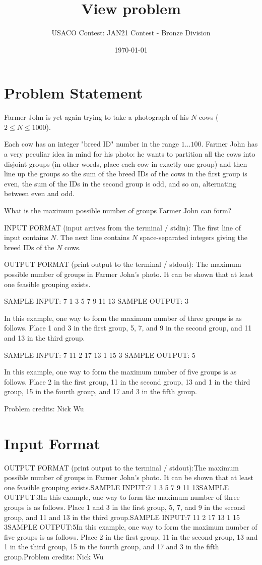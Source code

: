 \documentclass[12pt]{article}
\title{View problem}
\author{USACO Contest: JAN21 Contest - Bronze Division}
\date{\today}
\begin{document}
\maketitle

\section*{Problem Statement}

Farmer John is yet again trying to take a photograph of his $N$ cows
($2 \leq N \leq 1000$).

Each cow has an integer "breed ID" number in the range $1 \ldots 100$.  Farmer
John has a very peculiar idea in mind for his photo: he wants to partition all
the cows into disjoint groups (in other words, place each cow in exactly one group) and then
line up the groups so the sum of the breed IDs of  the cows in the first group
is even, the sum of the IDs in the second group is odd, and so on, alternating
between even and odd.  

What is the maximum possible number of groups Farmer John can form?  

INPUT FORMAT (input arrives from the terminal / stdin):
The first line of input contains $N$.  The next line contains $N$ 
space-separated integers giving the breed IDs of the $N$ cows.

OUTPUT FORMAT (print output to the terminal / stdout):
The maximum possible number of groups in Farmer John's photo. It can be shown
that at least one feasible grouping exists.

SAMPLE INPUT:
7
1 3 5 7 9 11 13
SAMPLE OUTPUT: 
3

In this example, one way to form the maximum number of three groups is as
follows. Place 1 and 3 in the first group, 5, 7, and 9 in the second group, and
11 and 13 in the third group.

SAMPLE INPUT:
7
11 2 17 13 1 15 3
SAMPLE OUTPUT: 
5

In this example, one way to form the maximum number of five groups is as
follows. Place 2 in the first group, 11 in the second group, 13 and 1 in the
third group, 15 in the fourth group, and 17 and 3 in the fifth group.


Problem credits: Nick Wu



\section*{Input Format}
OUTPUT FORMAT (print output to the terminal / stdout):The maximum possible number of groups in Farmer John's photo. It can be shown
that at least one feasible grouping exists.SAMPLE INPUT:7
1 3 5 7 9 11 13SAMPLE OUTPUT:3In this example, one way to form the maximum number of three groups is as
follows. Place 1 and 3 in the first group, 5, 7, and 9 in the second group, and
11 and 13 in the third group.SAMPLE INPUT:7
11 2 17 13 1 15 3SAMPLE OUTPUT:5In this example, one way to form the maximum number of five groups is as
follows. Place 2 in the first group, 11 in the second group, 13 and 1 in the
third group, 15 in the fourth group, and 17 and 3 in the fifth group.Problem credits: Nick Wu
\end{document}
